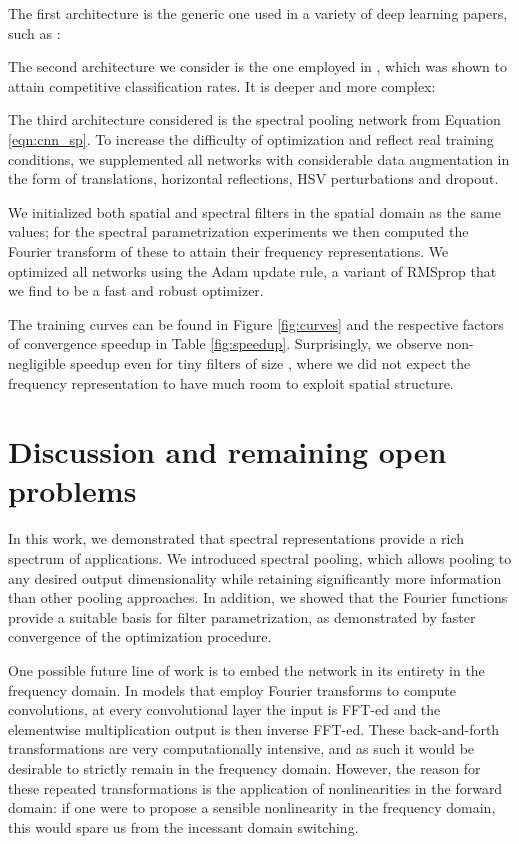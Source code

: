 \documentclass{article} \usepackage{nips15submit_e,times}
\begin{document}
The first architecture is the generic one used in a variety of deep learning papers, such as \citet{krizhevsky-et-al-2012,snoek-etal-2012b,Krizhevsky09learningmultiple,adam2015}:


The second architecture we consider is the one employed in \citet{scalable_2015}, which was shown to attain competitive classification rates. It is deeper and more complex:


The third architecture considered is the spectral pooling network from Equation \ref{eqn:cnn_sp}. To increase the difficulty of optimization and reflect real training conditions, we supplemented all networks with considerable data augmentation in the form of translations, horizontal reflections, HSV perturbations and dropout.

We initialized both spatial and spectral filters in the spatial domain as the same values; for the spectral parametrization experiments we then computed the Fourier transform of these to attain their frequency representations. We optimized all networks using the Adam \citep{adam2015} update rule, a variant of RMSprop that we find to be a fast and robust optimizer.

The training curves can be found in Figure \ref{fig:curves} and the respective factors of convergence speedup in Table \ref{fig:speedup}. Surprisingly, we observe non-negligible speedup even for tiny filters of size , where we did not expect the frequency representation to have much room to exploit spatial structure. 


\section{Discussion and remaining open problems}
\label{sec:discussion}
In this work, we demonstrated that spectral representations provide a rich spectrum of applications. We introduced spectral pooling, which allows pooling to any desired output dimensionality while retaining significantly more information than other pooling approaches. In addition, we showed that the Fourier functions provide a suitable basis for filter parametrization, as demonstrated by faster convergence of the optimization procedure.

One possible future line of work is to embed the network in its entirety in the frequency domain. In models that employ Fourier transforms to compute convolutions, at every convolutional layer the input is FFT-ed and the elementwise multiplication output is then inverse FFT-ed. These back-and-forth transformations are very computationally intensive, and as such it would be desirable to strictly remain in the frequency domain. However, the reason for these repeated transformations is the application of nonlinearities in the forward domain: if one were to propose a sensible nonlinearity in the frequency domain, this would spare us from the incessant domain switching.
\end{document}
